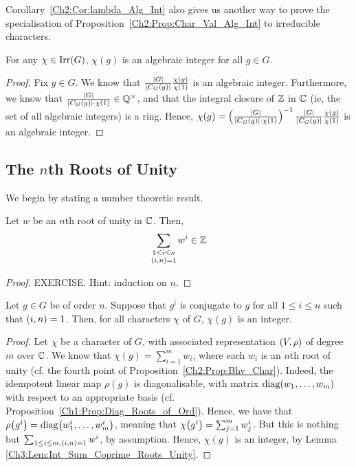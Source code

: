 Corollary~\ref{Ch2:Cor:lambda_Alg_Int} also gives us another way to prove the specialisation of Proposition~\ref{Ch2:Prop:Char_Val_Alg_Int} to irreducible characters.

\begin{corollary}
    For any $\chi \in \operatorname{Irr}\!\left( G \right)$, $\chi(g)$ is an algebraic integer for all $g \in G$.
\end{corollary}
\begin{proof}
    Fix $g \in G$. We know that $\frac{\left\lvert G \right\rvert}{\left\lvert C_G(g) \right\rvert}\frac{\chi(g)}{\chi(1)}$ is an algebraic integer. Furthermore, we know that $\frac{\left\lvert G \right\rvert}{\left\lvert C_G(g) \right\rvert \cdot \chi(1)} \in \mathbb{Q}^{\times}$, and that the integral closure of $\mathbb{Z}$ in $\mathbb{C}$ (ie, the set of all algebraic integers) is a ring. Hence, $\chi(g) = \left( \frac{\left\lvert G \right\rvert}{\left\lvert C_G(g) \right\rvert \cdot \chi(1)} \right)^{-1} \frac{\left\lvert G \right\rvert}{\left\lvert C_G(g) \right\rvert}\frac{\chi(g)}{\chi(1)}$ is an algebraic integer.
\end{proof}



\subsection{The $n$th Roots of Unity}

We begin by stating a number theoretic result.

\begin{lemma}\label{Ch3:Lem:Int_Sum_Coprime_Roots_Unity}
    Let $w$ be an $n$th root of unity in $\mathbb{C}$. Then,
    \begin{align*}
        \sum_{\substack{1 \leq i \leq n \\ \left( i,n \right) = 1}} w^i \in \mathbb{Z}
    \end{align*}
\end{lemma}
\begin{proof}
    EXERCISE. Hint: induction on $n$.
\end{proof}

\begin{proposition}
    Let $g \in G$ be of order $n$. Suppose that $g^i$ is conjugate to $g$ for all $1 \leq i \leq n$ such that $\left( i,n \right) = 1$. Then, for all characters $\chi$ of $G$, $\chi(g)$ is an integer.
\end{proposition}
\begin{proof}
    Let $\chi$ be a character of $G$, with associated representation $\left( V, \rho \right)$ of degree $m$ over $\mathbb{C}$. We know that $\chi(g) = \sum_{i=1}^{m} w_i$, where each $w_i$ is an $n$th root of unity (cf. the fourth point of Proposition~\ref{Ch2:Prop:Bhv_Char}). Indeed, the idempotent linear map $\rho(g)$ is diagonalisable, with matrix $\operatorname{diag}\!\left( w_1, \ldots, w_m \right)$ with respect to an appropriate basis (cf. Proposition~\ref{Ch1:Prop:Diag_Roots_of_Ord}). Hence, we have that $\rho\!\left( g^i \right) = \operatorname{diag}\!\left( w_1^i, \ldots, w_m^i \right)$, meaning that $\chi\!\left( g^i \right) = \sum_{j=1}^{m} w_j^i$. But this is nothing but $\sum_{1 \leq i \leq m, \left( i,n \right) = 1} w^i$, by assumption. Hence, $\chi(g)$ is an integer, by Lemma \ref{Ch3:Lem:Int_Sum_Coprime_Roots_Unity}.
\end{proof}


